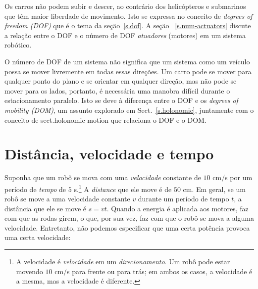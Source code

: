 Os carros não podem subir e descer, ao contrário dos helicópteros e submarinos que têm maior liberdade de movimento. Isto se expressa no conceito de \emph{degrees of freedom (DOF)} que é o tema da seção~\ref{s.dof}. A seção ~\ref{s.num-actuators} discute a relação entre o DOF e o número de DOF \emph{atuadores} (motores) em um sistema robótico.

O número de DOF de um sistema não significa que um sistema como um veículo possa se mover livremente em todas essas direções. Um carro pode se mover para qualquer ponto do plano e se orientar em qualquer direção, mas não pode se mover para os lados, portanto, é necessária uma manobra difícil durante o estacionamento paralelo. Isto se deve à diferença entre o DOF e os \emph{degrees of mobility (DOM)}, um assunto explorado em Sect.~\ref{s.holonomic}, juntamente com o conceito de {sect.holonomic motion} que relaciona o DOF e o DOM.

\section{Distância, velocidade e tempo}\label{s.distance-velocity}

Suponha que um robô se mova com uma \emph{velocidade} constante de $10$ cm/s por um período de \emph{tempo} de $5$ s.\footnote{A velocidade é  \emph{velocidade} em um \emph{direcionamento}. Um robô pode estar movendo $10$ cm/s para frente ou para trás; em ambos os casos, a velocidade é a mesma, mas a velocidade é diferente.}
A \emph{distance} que ele move é de $50$ cm. Em geral, se um robô se move a uma velocidade constante $v$ durante um período de tempo $t$, a distância que ele se move é $s=vt$. Quando a energia é aplicada aos motores, faz com que as rodas girem, o que, por sua vez, faz com que o robô se mova a alguma velocidade. Entretanto, não podemos especificar que uma certa potência provoca uma certa velocidade:

